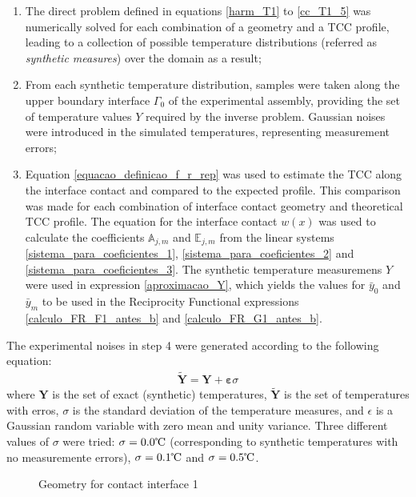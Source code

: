 \documentclass[conference,compsoc,fleqn]{IEEEtran}
\begin{document}
\begin{enumerate}
	\item The direct problem defined in equations \eqref{harm_T1} to \eqref{cc_T1_5} was numerically solved for each combination of a geometry and a TCC profile, leading to a collection of possible temperature distributions (referred as \textit{synthetic measures}) over the domain as a result;
	\item From each synthetic temperature distribution, samples were taken along the upper boundary interface $\Gamma_0$ of the experimental assembly, providing the set of temperature values $Y$ required by the inverse problem. Gaussian noises were introduced in the simulated temperatures, representing measurement errors;
	\item Equation \eqref{equacao_definicao_f_r_rep} was used to estimate the TCC along the interface contact and compared to the expected profile. This comparison was made for each combination of interface contact geometry and theoretical TCC profile. The equation for the interface contact $w(x)$ was used to calculate the coefficients $\mathbb{A}_{j,m}$ and $\mathbb{E}_{j,m}$ from the linear systems \eqref{sistema_para_coeficientes_1}, \eqref{sistema_para_coeficientes_2} and \eqref{sistema_para_coeficientes_3}. The synthetic temperature measuremens $Y$ were used in expression \eqref{aproximacao_Y}, which yields the values for $\bar{y}_0$ and $\bar{y}_m$ to be used in the Reciprocity Functional expressions \eqref{calculo_FR_F1_antes_b} and \eqref{calculo_FR_G1_antes_b}.
\end{enumerate}

The experimental noises in step 4 were generated according to the following equation:
\begin{align}
\tilde{\mathbf{Y}} = \mathbf{Y} + \mathbf{\varepsilon} \sigma \label{modelagem_erro}
\end{align}
where $\mathbf{Y}$ is the set of exact (synthetic) temperatures, $\tilde{\mathbf{Y}}$ is the set of temperatures with erros, $\sigma$ is the standard deviation of the temperature measures, and $\epsilon$ is a Gaussian random variable with zero mean and unity variance. Three different values of $\sigma$ were tried: $\sigma = \text{0.0}\celsius$ (corresponding to synthetic temperatures with no measuremente errors), $\sigma = \text{0.1}\celsius$ and $\sigma = \text{0.5}\celsius$.

\begin{figure}[H]
	\begin{center}
		\caption{Geometry for contact interface 1}
		\label{fig-interface1}
	\end{center}
\end{figure}
\end{document}
